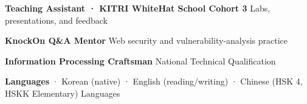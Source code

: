   {\textbf{Teaching Assistant · KITRI WhiteHat School Cohort 3}}
  {Labs, presentations, and feedback}

  {\textbf{KnockOn Q\&A Mentor}}
  {Web security and vulnerability-analysis practice}

  {\textbf{Information Processing Craftsman}}
  {National Technical Qualification}

\compactentry{}
  {\textbf{Languages} · Korean (native) · English (reading/writing) · Chinese (HSK 4, HSKK Elementary)}
  {Languages}


